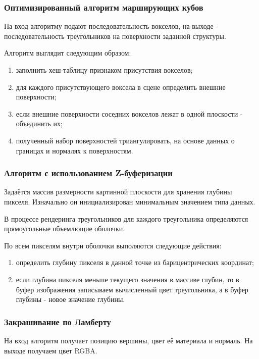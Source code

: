\subsubsection{Оптимизированный алгоритм марширующих кубов}

На вход алгоритму подают последовательность вокселов, на выходе -
последовательность треугольников на поверхности заданной структуры.

Алгоритм выглядит следующим образом:
\begin{enumerate}
    \item заполнить хеш-таблицу признаком присутствия вокселов;
    \item для каждого присутствующего воксела в сцене определить внешние поверхности;
    \item если внешние поверхности соседних вокселов лежат в одной плоскости - объединить их;
    \item полученный набор поверхностей триангулировать, на основе данных о границах и нормалях к поверхностям.
\end{enumerate}

\subsubsection{Алгоритм с использованием Z-буферизации}

Задаётся массив размерности картинной плоскости для хранения глубины пикселя.
Изначально он инициализирован минимальным значением типа данных.

В процессе рендеринга треугольников для каждого треугольника определяются
прямоугольные объемлющие оболочки.

По всем пикселям внутри оболочки выполяются следующие действия:
\begin{enumerate}
    \item определить глубину пикселя в данной точке из барицентрических координат;
    \item если глубина пикселя меньше текущего значения в массиве глубин, то
    в буфер изображения записываем вычисленный цвет треугольника, а в буфер глубины - новое значение глубины.
\end{enumerate}

\subsubsection{Закрашивание по Ламберту}

На вход алгоритм получает позицию вершины, цвет её материала и нормаль.
На выходе получаем цвет RGBA.

